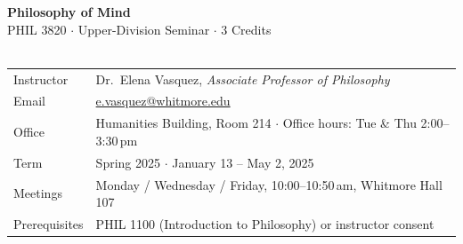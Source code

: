 \documentclass[11pt, a4paper]{article}
\begin{document}
\begin{center}
  {\fontsize{22}{26}\selectfont\bfseries\color{accent}
    Philosophy of Mind}\\[4pt]
  {\large\color{muted} PHIL 3820 $\cdot$ Upper-Division Seminar $\cdot$ 3 Credits}\\[10pt]
  \accentrule\\[10pt]
  \begin{tabularx}{\linewidth}{@{}K@{\hspace{8mm}}>{\raggedright\arraybackslash}X@{}}
    Instructor    & Dr.\ Elena Vasquez, \textit{Associate Professor of Philosophy} \\
    Email         & \href{mailto:e.vasquez@whitmore.edu}{e.vasquez@whitmore.edu} \\
    Office        & Humanities Building, Room 214 $\cdot$ Office hours: Tue \& Thu 2:00–3:30\,pm \\
    Term          & Spring 2025 $\cdot$ January 13 – May 2, 2025 \\
    Meetings      & Monday / Wednesday / Friday, 10:00–10:50\,am, Whitmore Hall 107 \\
    Prerequisites & PHIL 1100 (Introduction to Philosophy) or instructor consent \\
  \end{tabularx}
\end{center}

\vspace{6pt}








\end{document}

